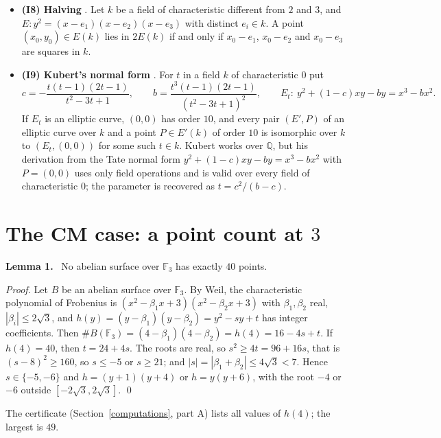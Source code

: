 \documentclass[11pt]{article}
\newenvironment{statement}[1]{\par\medskip\noindent\phantomsection\textbf{#1}\ }{\par\medskip}
\newcommand{\Q}{\mathbb Q}
\newcommand{\Z}{\mathbb Z}
\newcommand{\F}{\mathbb F}
\begin{document}
\begin{itemize}
\item \textbf{(I8) Halving} \cite[Theorem~4.2]{Kn}. Let \(k\) be a field of characteristic
different from \(2\) and \(3\), and \(E:y^2=(x-e_1)(x-e_2)(x-e_3)\) with distinct \(e_i\in k\). A point
\((x_0,y_0)\in E(k)\) lies in \(2E(k)\) if and only if \(x_0-e_1\), \(x_0-e_2\) and \(x_0-e_3\)
are squares in \(k\).

\item \textbf{(I9) Kubert's normal form} \cite[Table~3, the entry for \(\Z/10\), with
\(f=t\)]{Ku}. For \(t\) in a field \(k\) of characteristic \(0\) put
\[c=-\frac{t(t-1)(2t-1)}{t^2-3t+1},\qquad b=\frac{t^3(t-1)(2t-1)}{(t^2-3t+1)^2},\qquad
E_t:\ y^2+(1-c)xy-by=x^3-bx^2 .\]
If \(E_t\) is an elliptic curve, \((0,0)\) has order \(10\), and every pair \((E',P)\) of an
elliptic curve over \(k\) and a point \(P\in E'(k)\) of order \(10\) is isomorphic over \(k\) to
\((E_t,(0,0))\) for some such \(t\in k\). Kubert works over \(\Q\), but his derivation from the
Tate normal form \(y^2+(1-c)xy-by=x^3-bx^2\) with \(P=(0,0)\) uses only field operations and is
valid over every field of characteristic \(0\); the parameter is recovered as \(t=c^2/(b-c)\).
\end{itemize}

\section{The CM case: a point count at \(3\)}\label{cm}

\begin{statement}{Lemma 1.}\label{lemma-f3}
No abelian surface over \(\F_3\) has exactly \(40\) points.
\end{statement}

\emph{Proof.} Let \(B\) be an abelian surface over \(\F_3\). By Weil, the characteristic
polynomial of Frobenius is \((x^2-\beta_1x+3)(x^2-\beta_2x+3)\) with \(\beta_1,\beta_2\) real,
\(|\beta_i|\le2\sqrt3\), and \(h(y)=(y-\beta_1)(y-\beta_2)=y^2-sy+t\) has integer coefficients.
Then \(\#B(\F_3)=(4-\beta_1)(4-\beta_2)=h(4)=16-4s+t\). If \(h(4)=40\), then \(t=24+4s\). The roots
are real, so \(s^2\ge4t=96+16s\), that is \((s-8)^2\ge160\), so \(s\le-5\) or \(s\ge21\); and
\(|s|=|\beta_1+\beta_2|\le4\sqrt3<7\). Hence \(s\in\{-5,-6\}\) and \(h=(y+1)(y+4)\) or
\(h=y(y+6)\), with the root \(-4\) or \(-6\) outside \([-2\sqrt3,2\sqrt3]\). \qed

\medskip
The certificate (Section~\ref{computations}, part A) lists all values of \(h(4)\); the largest is
\(49\).
\end{document}
